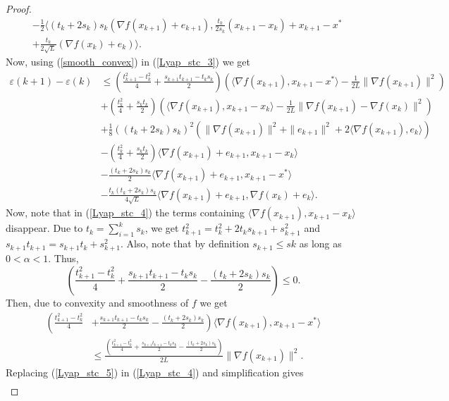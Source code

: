 \documentclass{article}
\theoremstyle{plain}
\theoremstyle{definition}
\theoremstyle{remark}
\begin{document}
\begin{proof}
\begin{align}
        &-\frac{1}{2}\langle (t_k+2s_k)s_k (\nabla f(x_{k+1})+e_{k+1}), \frac{t_k}{2s_k}(x_{k+1}-x_k)+x_{k+1}-x^*\nonumber\\
        &+\frac{t_k}{2\sqrt{L}}(\nabla f(x_k)+e_k)\rangle.
    \end{align}
    Now, using (\ref{smooth_convex}) in (\ref{Lyap_stc_3}) we get
    \begin{align}\label{Lyap_stc_4}
         \varepsilon(k+1)-\varepsilon(k)&\leq (\frac{t_{k+1}^2-t_k^2}{4}+\frac{s_{k+1}t_{k+1}-t_ks_k}{2})(\langle \nabla f(x_{k+1}),x_{k+1}-x^* \rangle-\frac{1}{2L}\|\nabla f(x_{k+1})\|^2)\nonumber\\
         & +(\frac{t_{k}^2}{4}+\frac{s_{k}t_{k}}{2})(\langle \nabla f(x_{k+1}),x_{k+1}-x_k \rangle-\frac{1}{2L}\|\nabla f(x_{k+1})-\nabla f(x_k)\|^2)\nonumber\\
         & +\frac{1}{8}((t_k+2s_k)s_k)^2(\|\nabla f(x_{k+1})\|^2+\|e_{k+1}\|^2+2\langle \nabla f(x_{k+1}) ,e_k \rangle) \nonumber\\
         & -(\frac{t_k^2}{4}+\frac{s_kt_k}{2})\langle \nabla f(x_{k+1})+e_{k+1},x_{k+1}-x_k\rangle\nonumber\\
         &-\frac{(t_k+2s_k)s_k}{2}\langle \nabla f(x_{k+1})+e_{k+1},x_{k+1}-x^*\rangle\nonumber\\
         & -\frac{t_k(t_k+2s_k)s_k}{4\sqrt{L}}\langle \nabla f(x_{k+1})+e_{k+1}, \nabla f(x_k)+e_k \rangle.
         \end{align}
         Now, note that in (\ref{Lyap_stc_4}) the terms containing $\langle \nabla f(x_{k+1}),x_{k+1}-x_k \rangle$ disappear. Due to $t_k=\sum_{i=1}^k s_k$, we get $t_{k+1}^2=t_k^2 + 2t_ks_{k+1}+ s_{k+1}^2$ and $s_{k+1}t_{k+1}=s_{k+1}t_k+s_{k+1}^2$. Also, note  that by definition $s_{k+1}\leq s{k}$ as long as $0<\alpha<1$. Thus,
         $$\left(\frac{t_{k+1}^2-t_k^2}{4}+\frac{s_{k+1}t_{k+1}-t_ks_k}{2} -\frac{(t_k+2s_k)s_k}{2}\right)\leq 0.$$
         Then, due to convexity and smoothness of $f$ we get
         \begin{align}\label{Lyap_stc_5}
             \left(\frac{t_{k+1}^2-t_k^2}{4}\right.&\left.+\frac{s_{k+1}t_{k+1}-t_ks_k}{2} -\frac{(t_k+2s_k)s_k}{2}\right)\langle \nabla f(x_{k+1}), x_{k+1}-x^* \rangle\nonumber\\
             &\leq \frac{\left(\frac{t_{k+1}^2-t_k^2}{4}+\frac{s_{k+1}t_{k+1}-t_ks_k}{2} -\frac{(t_k+2s_k)s_k}{2}\right)}{2L}\|\nabla f(x_{k+1})\|^2.
         \end{align} 
        Replacing (\ref{Lyap_stc_5}) in (\ref{Lyap_stc_4}) and simplification gives
        \begin{align}\label{Lyap_stc_6}

\end{align}
\end{proof}
\end{document}
